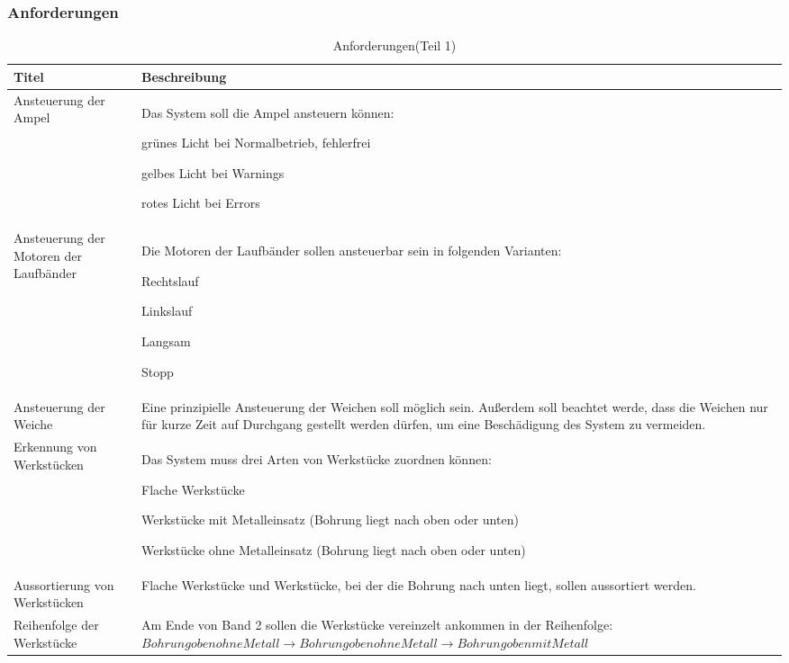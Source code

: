 \documentclass[a4paper, 11pt]{article}
\begin{document}
\newpage

\subsubsection{Anforderungen}
\begin{table}[h]
\center
\begin{tabularx}{\textwidth}{|X|X|}
\hline
\textbf{Titel}&\textbf{Beschreibung}\\
\hline
Ansteuerung der Ampel&Das System soll die Ampel ansteuern können:
\begin{compactenum}[-]
\item grünes Licht bei Normalbetrieb, fehlerfrei 
\item gelbes Licht bei Warnings 
\item rotes Licht bei Errors 
\end{compactenum}\\
\hline
Ansteuerung der Motoren der Laufbänder&Die Motoren der Laufbänder sollen ansteuerbar sein in folgenden Varianten: 
\begin{compactenum}[-]
\item Rechtslauf 
\item Linkslauf 
\item Langsam 
\item Stopp
\end{compactenum}\\
\hline
Ansteuerung der Weiche&Eine prinzipielle Ansteuerung der Weichen soll möglich sein. Außerdem soll beachtet werde, dass die Weichen nur für kurze Zeit auf Durchgang gestellt werden dürfen, um eine Beschädigung des System zu vermeiden.\\
\hline
Erkennung von Werkstücken&Das System muss drei Arten von Werkstücke zuordnen können: 
\begin{compactenum}[-]
\item Flache Werkstücke 
\item Werkstücke mit Metalleinsatz (Bohrung liegt nach oben oder unten) 
\item Werkstücke ohne Metalleinsatz (Bohrung liegt nach oben oder unten)
\end{compactenum}\\
\hline
Aussortierung von Werkstücken&Flache Werkstücke und Werkstücke, bei der die Bohrung nach unten liegt, sollen aussortiert werden. \\
\hline
Reihenfolge der Werkstücke&Am Ende von Band 2 sollen die Werkstücke vereinzelt ankommen in der Reihenfolge:\hspace{2cm}
$Bohrung oben ohne Metall\rightarrow Bohrung oben ohne Metall\rightarrow Bohrung oben mit Metall$ \\
\hline
\end{tabularx}
\caption{Anforderungen(Teil 1)}
\label{anf1}
\end{table}
\end{document}
